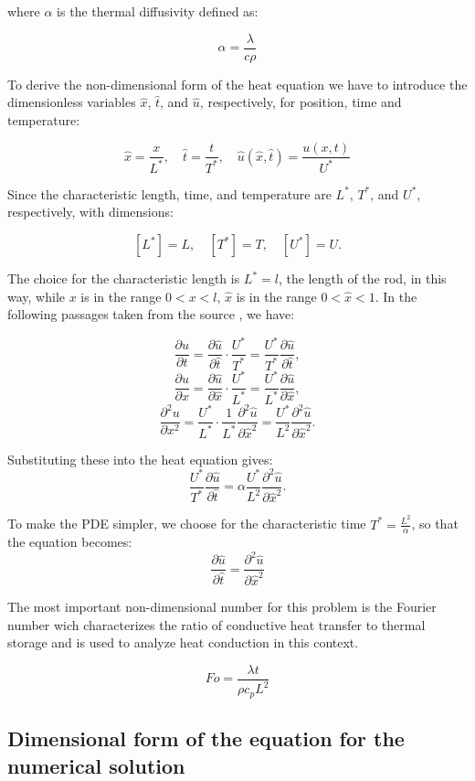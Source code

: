 \documentclass{article}
\begin{document}
where \(\alpha\) is the thermal diffusivity defined as:

\[
\alpha = \frac{\lambda}{c \rho} 
\]

To derive the non-dimensional form of the heat equation we have to introduce the dimensionless variables \(\hat{x}\), \(\hat{t}\),
and \(\hat{u}\), respectively, for position, time and temperature:

\[
\hat{x} = \frac{x}{L^*}, \quad \hat{t} = \frac{t}{T^*}, \quad \hat{u}(\hat{x}, \hat{t}) = \frac{u(x, t)}{U^*}
\]

Since the characteristic length, time, and temperature are \( L^* \), \( T^* \), and \( U^* \), respectively, with dimensions:

\[
[L^*] = L, \quad [T^*] = T, \quad [U^*] = U.
\]

The choice for the characteristic length is \( L^* = l \), the length of the rod, in this way, while \( x \) is in the range 
\( 0 < x < l \), \(\hat{x}\) is in the range \( 0 < \hat{x} < 1 \). In the following passages taken from the source \cite{HeatEquation}, we have:

\[
\frac{\partial u}{\partial t} = \frac{\partial \hat{u}}{\partial \hat{t}} \cdot \frac{U^*}{T^*} = \frac{U^*}{T^*} \frac{\partial \hat{u}}{\partial \hat{t}},
\]
\[
\frac{\partial u}{\partial x} = \frac{\partial \hat{u}}{\partial \hat{x}} \cdot \frac{U^*}{L^*} = \frac{U^*}{L^*} \frac{\partial \hat{u}}{\partial \hat{x}},
\]
\[
\frac{\partial^2 u}{\partial x^2} = \frac{U^*}{L^*} \cdot \frac{1}{L^*} \frac{\partial^2 \hat{u}}{\partial \hat{x}^2} = \frac{U^*}{L^2} \frac{\partial^2 \hat{u}}{\partial \hat{x}^2}.
\]

Substituting these into the heat equation gives:
\[
\frac{U^*}{T^*} \frac{\partial \hat{u}}{\partial \hat{t}} = \alpha \frac{U^*}{L^2} \frac{\partial^2 \hat{u}}{\partial \hat{x}^2}.
\]

To make the PDE simpler, we choose for the characteristic time \( T^* = \frac{L^2}{\alpha}\), so that the equation becomes:
\[
\frac{\partial \hat{u}}{\partial \hat{t}} = \frac{\partial^2 \hat{u}}{\partial \hat{x}^2}
\]

The most important non-dimensional number for this problem is the Fourier number wich characterizes 
the ratio of conductive heat transfer to thermal storage and is used to analyze heat conduction in this context.

\[
Fo = \frac{\lambda t}{\rho c_p L^2}
\]

\subsection{Dimensional form of the equation for the numerical solution}
\end{document}
